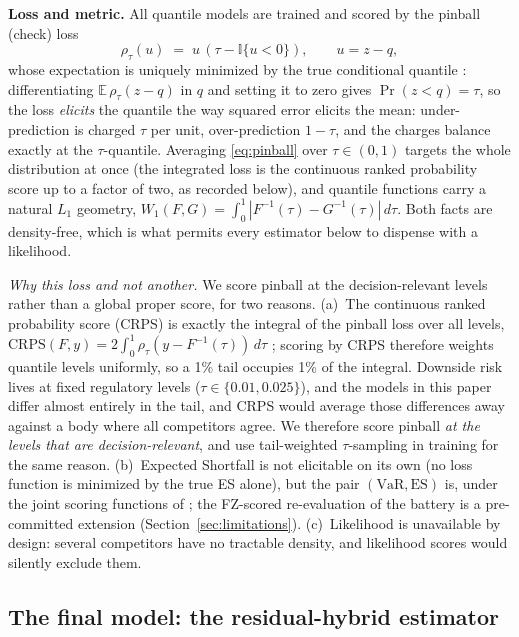 \documentclass[11pt]{article}
\newcommand{\VaR}{\mathrm{VaR}}
\newcommand{\ES}{\mathrm{ES}}
\theoremstyle{remark}
\begin{document}
\noindent\textbf{Loss and metric.} All quantile models are trained and
scored by the pinball (check) loss
\begin{equation}
\rho_\tau(u) \;=\; u\,(\tau - \mathbb{I}\{u<0\}),
\qquad u = z - q,
\label{eq:pinball}
\end{equation}
whose expectation is uniquely minimized by the true conditional quantile
\citep{koenker1978}: differentiating
$\mathbb{E}\,\rho_\tau(z - q)$ in $q$ and setting it to zero gives
$\Pr(z < q) = \tau$, so the loss \emph{elicits} the quantile the way
squared error elicits the mean: under-prediction is charged $\tau$
per unit, over-prediction $1-\tau$, and the charges balance exactly at
the $\tau$-quantile. Averaging \eqref{eq:pinball} over $\tau\in(0,1)$
targets the whole distribution at once (the integrated loss is the
continuous ranked probability score up to a factor of two, as recorded
below), and quantile functions carry a natural $L_1$ geometry,
$W_1(F,G)=\int_0^1 |F^{-1}(\tau)-G^{-1}(\tau)|\,d\tau$. Both facts
are density-free, which is what permits every estimator below to
dispense with a likelihood.

\emph{Why this loss and not another.} We score pinball at the
decision-relevant levels rather than a global proper score, for two
reasons. (a)~The continuous ranked probability
score (CRPS) is exactly the integral of the pinball loss over all
levels, $\mathrm{CRPS}(F,y) = 2\int_0^1 \rho_\tau(y - F^{-1}(\tau))\,
d\tau$ \citep{gneitingraftery2007}; scoring by CRPS therefore weights
quantile levels uniformly, so a 1\% tail occupies 1\% of the
integral. Downside
risk lives at fixed regulatory levels ($\tau \in \{0.01, 0.025\}$), and
the models in this paper differ almost entirely in the tail, and CRPS
would average those differences away against a body where all
competitors agree. We therefore score pinball \emph{at the levels that
are decision-relevant}, and use tail-weighted $\tau$-sampling in
training for the same reason. (b)~Expected Shortfall is not elicitable
on its own (no loss function is minimized by the true ES alone), but
the pair $(\VaR,\ES)$ is, under the joint scoring functions of
\citet{fissler2016}; the FZ-scored re-evaluation of the battery is a
pre-committed extension (Section~\ref{sec:limitations}). (c)~Likelihood is
unavailable by design: several competitors have no tractable density, and likelihood scores
would silently exclude them.

\subsection{The final model: the residual-hybrid estimator}\label{sec:hybrid}
\end{document}
